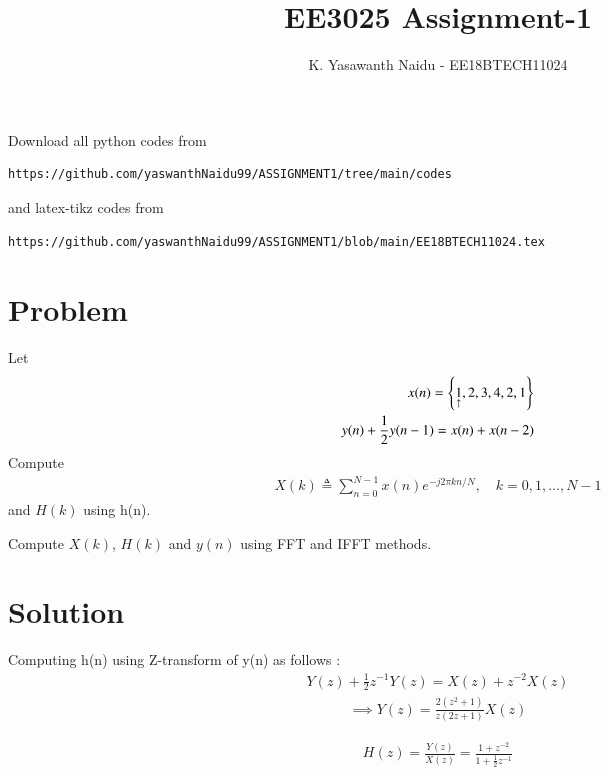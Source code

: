 \documentclass[journal,12pt,twocolumn]{IEEEtran}
\begin{document}
     \def\rightbox#1{\makebox[0in][r]{#1}}
     \def\centbox#1{\makebox[0in]{#1}}
     \def\topbox#1{\raisebox{-\baselineskip}[0in][0in]{#1}}
     \def\midbox#1{\raisebox{-0.5\baselineskip}[0in][0in]{#1}}
\vspace{3cm}
\title{EE3025 Assignment-1}
\author{K. Yasawanth Naidu - EE18BTECH11024}
\maketitle
\newpage
\bigskip
\renewcommand{\thefigure}{\theenumi}
\renewcommand{\thetable}{\theenumi}
Download all python codes from 
\begin{lstlisting}
https://github.com/yaswanthNaidu99/ASSIGNMENT1/tree/main/codes
\end{lstlisting}
%
and latex-tikz codes from 
%
\begin{lstlisting}
https://github.com/yaswanthNaidu99/ASSIGNMENT1/blob/main/EE18BTECH11024.tex
\end{lstlisting}


\section{Problem}
Let
\begin{align}
x(n) = \cbrak{\underset{\uparrow}{1},2,3,4,2,1}
\label{eq:equation0}\\
y(n) + \frac{1}{2}y(n-1) = x(n) + x(n-2)	
\label{eq:equation1}
\end{align}
Compute 
\begin{align}
  X(k) \triangleq \sum_{n=0}^{N-1} x(n) e^{-j 2 \pi k n / N}, \quad k=0,1, \ldots, N-1
\end{align}
and $H(k)$ using h(n).
    
Compute $X(k)$, $H(k)$ and $y(n)$ using FFT and IFFT methods.
\section{Solution}
Computing h(n) using Z-transform of y(n) as follows : 
\begin{align}
    Y(z) + \frac{1}{2}z^{-1}Y(z)=X(z) + z^{-2}X(z)
\end{align}
\begin{align}
    \implies Y(z)=\frac{2(z^2+1)}{z(2z+1)}X(z)
\end{align}

\begin{align}
    H(z) = \frac{Y(z)}{X(z)} = \frac{1+z^{-2}}{1+\frac{1}{2}z^{-1}}
\end{align}
\end{document}
